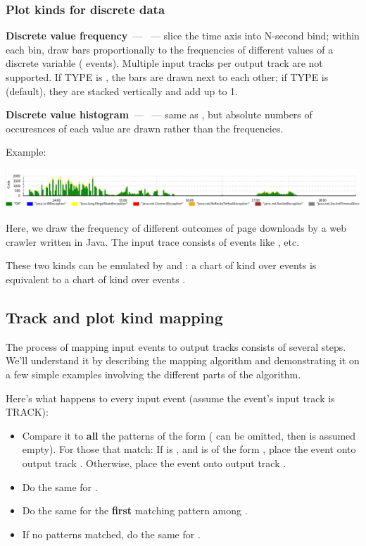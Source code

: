 \documentclass{article}
\begin{document}
\pagebreak
\subsubsection{Plot kinds for discrete data}
\noindent
\textbf{Discrete value frequency}~--- ~--- slice the time axis into N-second bind; within each bin, draw bars proportionally to the frequencies of different values of a discrete variable ( events). Multiple input tracks per output track are not supported. If TYPE is , the bars are drawn next to each other; if TYPE is  (default), they are stacked vertically and add up to 1.
\noindent

\textbf{Discrete value histogram}~--- ~--- same as , but absolute numbers of occuresnces of each value are drawn rather than the frequencies.

Example: 

\centerline{\includegraphics[width=\textwidth]{pics/tplot/download-exceptions-hist.png}}

Here, we draw the frequency of different outcomes of page downloads by a web crawler written in Java. The input trace consists of events like ,  etc.

These two kinds can be emulated by  and : a chart of kind  over events  is equivalent to a chart of kind  over events .

\pagebreak
\subsection{Track and plot kind mapping}
\label{sec:tplot-track-mapping}
The process of mapping input events to output tracks consists of several steps. We'll understand it by describing the mapping algorithm and demonstrating it on a few simple examples involving the different parts of the algorithm.

Here's what happens to every input event (assume the event's input track is TRACK):
\begin{itemize}
\item Compare it to \textbf{all} the patterns of the form  ( can be omitted, then  is assumed empty). For those that match:
\subitem If  is , and  is of the form , place the event onto output track .
\subitem Otherwise, place the event onto output track .
\item Do the same for .
\item Do the same for the \textbf{first} matching pattern among .
\item If no  patterns matched, do the same for .
\end{itemize}
\end{document}
